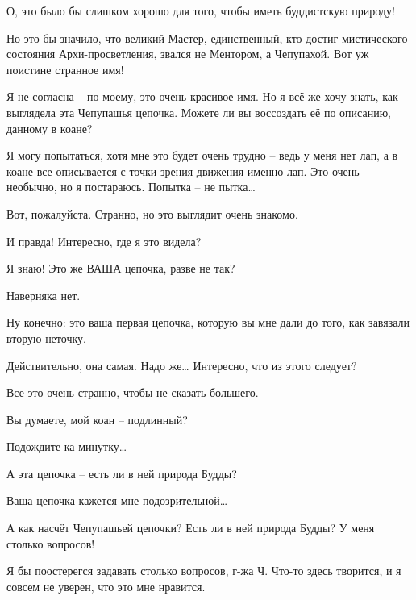 \documentclass[../main.tex]{subfiles}
\begin{document}
\begin{dialogue}
 О, это было бы слишком хорошо для того, чтобы иметь буддистскую природу!

 Но это бы значило, что великий Мастер, единственный, кто достиг мистического состояния Архи-просветления, звался не Ментором, а Чепупахой. Вот уж поистине странное имя!

 Я не согласна \--- по-моему, это очень красивое имя. Но я всё же хочу знать, как выглядела эта Чепупашья цепочка. Можете ли вы воссоздать её по описанию, данному в коане?

 Я могу попытаться, хотя мне это будет очень трудно \--- ведь у меня нет лап, а в коане все описывается с точки зрения движения именно лап. Это очень необычно, но я постараюсь. Попытка \--- не пытка\ldots{}


Вот, пожалуйста. Странно, но это выглядит очень знакомо.

 И правда! Интересно, где я это видела?

 Я знаю! Это же ВАША цепочка, разве не так?

 Наверняка нет.

 Ну конечно: это ваша первая цепочка, которую вы мне дали до того, как завязали вторую неточку.

 Действительно, она самая. Надо же\ldots{} Интересно, что из этого следует?

 Все это очень странно, чтобы не сказать большего.

 Вы думаете, мой коан \--- подлинный?

 Подождите-ка минутку\ldots{}

 А эта цепочка \--- есть ли в ней природа Будды?

 Ваша цепочка кажется мне подозрительной\ldots{}

 А как насчёт Чепупашьей цепочки? Есть ли в ней природа Будды? У меня столько вопросов!

 Я бы поостерегся задавать столько вопросов, г-жа Ч\@. Что-то здесь творится, и я совсем не уверен, что это мне нравится.


\end{dialogue}
\end{document}
